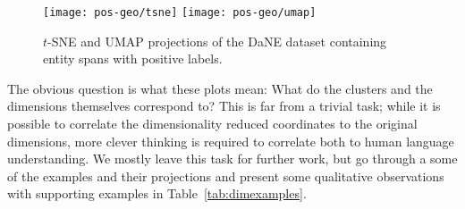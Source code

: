 \documentclass[main.tex]{subfiles}
\begin{document}
\begin{figure}[H]
    \centering
        \texttt{[image: pos-geo/tsne]}
        \texttt{[image: pos-geo/umap]}
    \caption{
        $t$-SNE and UMAP projections of the DaNE dataset containing entity spans with positive labels.
    }
    \label{fig:pos-tsne}
\end{figure}\noindent
The obvious question is what these plots mean: What do the clusters and the dimensions themselves correspond to?
This is far from a trivial task; while it is possible to correlate the dimensionality reduced coordinates to the original dimensions, more clever thinking is required to correlate both to human language understanding.
We mostly leave this task for further work, but go through a some of the examples and their projections and present some qualitative observations with supporting examples in Table~\ref{tab:dimexamples}.
\end{document}
